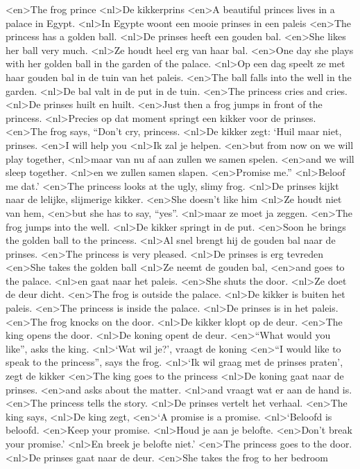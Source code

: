 <en>The frog prince
<nl>De kikkerprins
<en>A beautiful princes lives in a palace in Egypt.
<nl>In Egypte woont een mooie prinses in een paleis 
<en>The  princess has a golden ball.
<nl>De prinses heeft een gouden bal.
<en>She likes her ball very much.
<nl>Ze houdt heel erg van haar bal.
<en>One day she plays with her golden ball in the garden of the palace.
<nl>Op een dag speelt ze met haar gouden bal in de tuin van het paleis.
<en>The ball falls into the well in the garden.
<nl>De bal valt in de put in de tuin.
<en>The princess cries and cries.
<nl>De prinses huilt en huilt.
<en>Just then a frog jumps in front of the princess.
<nl>Precies op dat moment springt een kikker voor de prinses.
<en>The frog says, “Don’t cry, princess.
<nl>De kikker zegt: `Huil maar niet, prinses.
<en>I will help you
<nl>Ik zal je helpen.
<en>but from now on we will play together, 
<nl>maar van nu af aan zullen we samen spelen. 
<en>and we will sleep together.
<nl>en we zullen samen slapen.
<en>Promise me.”
<nl>Beloof me dat.'
<en>The princess looks at the ugly, slimy frog.
<nl>De prinses kijkt naar de lelijke, slijmerige kikker.
<en>She doesn’t like him
<nl>Ze houdt niet van hem,
<en>but she has to say, “yes”.
<nl>maar ze moet ja zeggen.
<en>The frog jumps into the well.
<nl>De kikker springt in de put.
<en>Soon he brings the golden ball to the princess.
<nl>Al snel brengt hij de gouden bal naar de prinses.
<en>The princess is very pleased.
<nl>De prinses is erg tevreden
<en>She takes the golden ball
<nl>Ze neemt de gouden bal,
<en>and goes to the palace.
<nl>en gaat naar het paleis.
<en>She shuts the door.
<nl>Ze doet de deur dicht.
<en>The frog is outside the palace.
<nl>De kikker is buiten het paleis.
<en>The princess is inside the palace.
<nl>De prinses is in het paleis.
<en>The frog knocks on the door.
<nl>De kikker klopt op de deur.
<en>The king opens the door.
<nl>De koning opent de deur.
<en>“What would you like”, asks the king.
<nl>`Wat wil je?', vraagt de koning
<en>“I would like to speak to the princess”, says the frog.
<nl>`Ik wil graag met de prinses praten', zegt de kikker
<en>The king goes to the princess
<nl>De koning gaat naar de prinses.
<en>and asks about the matter.
<nl>and vraagt wat er aan de hand is.
<en>The princess tells the story.
<nl>De prinses vertelt het verhaal.
<en>The king says,
<nl>De king zegt,
<en>`A promise is a promise.
<nl>`Beloofd is beloofd.
<en>Keep your promise.
<nl>Houd je aan je belofte.
<en>Don’t break your promise.'
<nl>En breek je belofte niet.'
<en>The princess goes to the door.
<nl>De prinses gaat naar de deur.
<en>She takes the frog to her bedroom
